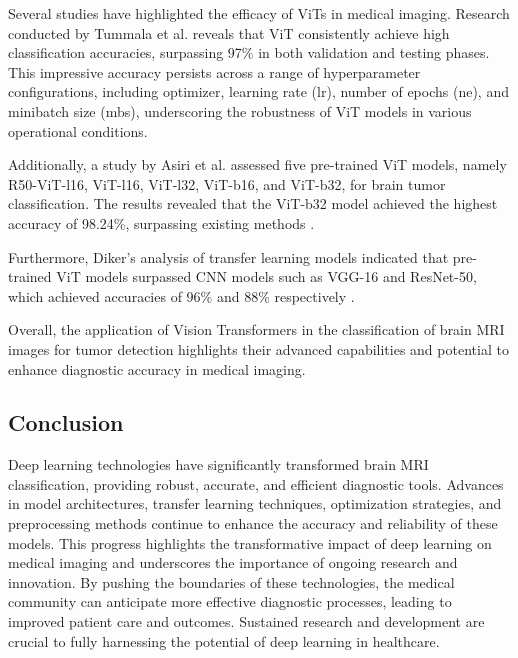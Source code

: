 Several studies have highlighted the efficacy of ViTs in medical imaging. Research conducted by Tummala et al. \cite{Tummala2022} reveals that ViT consistently achieve high classification accuracies, surpassing 97\% in both validation and testing phases. This impressive accuracy persists across a range of hyperparameter configurations, including optimizer, learning rate (lr), number of epochs (ne), and minibatch size (mbs), underscoring the robustness of ViT models in various operational conditions.

Additionally, a study by Asiri et al. assessed five pre-trained ViT models, namely R50-ViT-l16, ViT-l16, ViT-l32, ViT-b16, and ViT-b32, for brain tumor classification. The results revealed that the ViT-b32 model achieved the highest accuracy of 98.24\%, surpassing existing methods \cite{Asiri2023Advancing}. 

Furthermore, Diker's analysis of transfer learning models indicated that pre-trained ViT models surpassed CNN models such as VGG-16 and ResNet-50, which achieved accuracies of 96\% and 88\% respectively \cite{Diker2021A}.

Overall, the application of Vision Transformers in the classification of brain MRI images for tumor detection highlights their advanced capabilities and potential to enhance diagnostic accuracy in medical imaging.


\subsection{Conclusion}

Deep learning technologies have significantly transformed brain MRI classification, providing robust, accurate, and efficient diagnostic tools. Advances in model architectures, transfer learning techniques, optimization strategies, and preprocessing methods continue to enhance the accuracy and reliability of these models. This progress highlights the transformative impact of deep learning on medical imaging and underscores the importance of ongoing research and innovation. By pushing the boundaries of these technologies, the medical community can anticipate more effective diagnostic processes, leading to improved patient care and outcomes. Sustained research and development are crucial to fully harnessing the potential of deep learning in healthcare.
